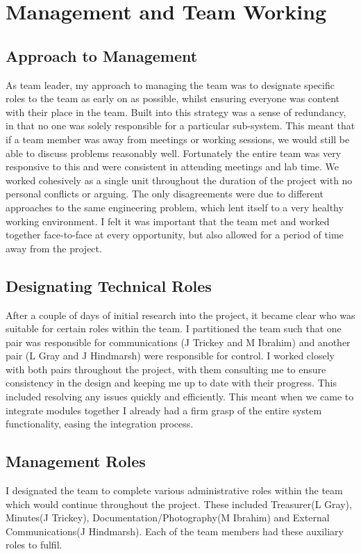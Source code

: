 \documentclass[a4paper,11pt]{article}
\begin{document}
\section{Management and Team Working}
\subsection{Approach to Management}
As team leader, my approach to managing the team was to designate specific roles to the team as early on as possible, whilst ensuring everyone was content with their place in the team. Built into this strategy was a sense of redundancy, in that no one was solely responsible for a particular sub-system. This meant that if a team member was away from meetings or working sessions, we would still be able to discuss problems reasonably well. Fortunately the entire team was very responsive to this and were consistent in attending meetings and lab time. We worked cohesively as a single unit throughout the duration of the project with no personal conflicts or arguing. The only disagreements were due to different approaches to the same engineering problem, which lent itself to a very healthy working environment. I felt it was important that the team met and worked together face-to-face at every opportunity, but also allowed for a period of time away from the project. 
\subsection{Designating Technical Roles}
After a couple of days of initial research into the project, it became clear who was suitable for certain roles within the team. I partitioned the team such that one pair was responsible for communications (J Trickey and M Ibrahim) and another pair (L Gray and J Hindmarsh) were responsible for control. I worked closely with both pairs throughout the project, with them consulting me to ensure consistency in the design and keeping me up to date with their progress. This included resolving any issues quickly and efficiently. This meant when we came to integrate modules together I already had a firm grasp of the entire system functionality, easing the integration process.
\subsection{Management Roles}
I designated the team to complete various administrative roles within the team which would continue throughout the project. These included Treasurer(L Gray), Minutes(J Trickey), Documentation/Photography(M Ibrahim) and External Communications(J Hindmarsh). Each of the team members had these auxiliary roles to fulfil.
\end{document}
